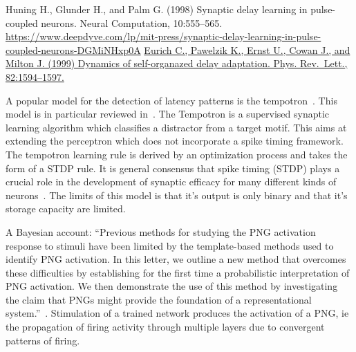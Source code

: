 \documentclass[brainsci, %
               review,submit,pdftex,moreauthors%
               ]{Definitions/mdpi}
\begin{document}

    Huning H., Glunder H., and Palm G. (1998) Synaptic delay learning in pulse-coupled neurons. Neural Computation, 10:555--565. \url{https://www.deepdyve.com/lp/mit-press/synaptic-delay-learning-in-pulse-coupled-neurons-DGMiNHxp0A}
    \href{https://www.researchgate.net/publication/37921636_Dynamics_of_Self-Organized_Delay_Adaptation}{Eurich C., Pawelzik K., Ernst U., Cowan J., and Milton J. (1999) Dynamics of self-organazed delay adaptation. Phys. Rev.~Lett., 82:1594--1597.}
  
A popular model for the detection of latency patterns is the tempotron~\citep{gutig_tempotron_2006}. This model is in particular reviewed in~\citep{gutig_spike_2014}. The Tempotron is a supervised synaptic learning algorithm which classifies a distractor from a target motif. This aims at extending the perceptron which does not incorporate a spike timing framework. The tempotron learning rule is derived by an optimization process and takes the form of a STDP rule. It is general consensus that spike timing (STDP) plays a crucial role in the development of synaptic efficacy for many different kinds of neurons~\citep{caporale_spike_2008}. The limits of this model is that it's output is only binary and that it's storage capacity are limited.


A Bayesian account: ``Previous methods for studying the PNG activation response to stimuli have been limited by the template-based methods used to identify PNG activation. In this letter, we outline a new method that overcomes these difficulties by establishing for the first time a probabilistic interpretation of PNG activation. We then demonstrate the use of this method by investigating the claim that PNGs might provide the foundation of a representational system.''~\citep{guise_bayesian_2014}. Stimulation of a trained network produces the activation of a PNG, ie the propagation of firing activity through multiple layers due to convergent patterns of firing.
\end{document}
